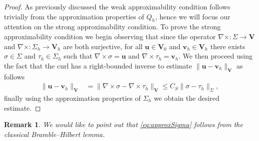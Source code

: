 \documentclass[USenglish]{article}
\theoremstyle{dgthm}
\theoremstyle{dgdef}
\newtheorem{remark}{Remark}
\let\vec\bm
\newcommand\norm[1]{\lVert#1\rVert}
\begin{document}
\begin{proof}
  As previously discussed the weak approximability condition follows trivially from the approximation properties of $Q_h$, hence we will focus our attention on the strong approximability condition.
  To prove the strong approximability condition we begin observing that since the operator $\nabla\times:\Sigma\to\vec{V}$  and $\nabla\times:\Sigma_h\to\vec{V}_h$ are both surjective, for all $\vec{u}\in \vec{V}_0$ and $\vec{v}_h\in \vec{V}_h$ there exists $\sigma\in \Sigma$ and $\tau_h\in \Sigma_h$ such that $\nabla\times \sigma = \vec{u}$ and $\nabla\times \tau_h = \vec{v}_h$.
  We then proceed using the fact that the curl has a right-bounded inverse to estimate $\norm{\vec{u}-\vec{v}_h}_{\vec{V}}$ as follows
  \begin{align}
\norm{\vec{u}-\vec{v}_h}_{\vec{V}} &= \norm{\nabla\times\sigma-\nabla\times\tau_h}_{\vec{V}}\leq C_S\norm{\sigma-\tau_h}_{\Sigma},
  \end{align}
  finally using the approximation properties of $\Sigma_h$ we obtain the desired estimate.
\end{proof}
\begin{remark}
  We would like to point out that \eqref{eq:approxSigma} follows from the classical Bramble--Hilbert lemma.
\end{remark}

\end{document}
